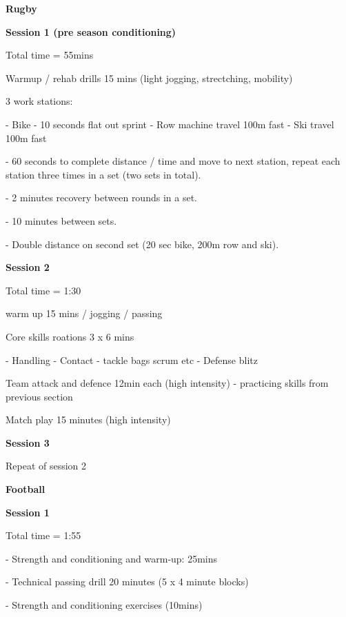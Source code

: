 \documentclass[
  english,
  man,floatsintext]{apa6}
\begin{document}
\begin{flushleft}

\begin{center}

  \textbf{Rugby}
  
\end{center}

  \textbf{Session 1 (pre season conditioning)}

Total time = 55mins

Warmup / rehab drills 15 mins (light jogging, strectching, mobility)

3 work stations:

- Bike - 10 seconds flat out sprint
- Row machine travel 100m fast
- Ski travel 100m fast

- 60 seconds to complete distance / time and move to next station, repeat each station three times in a set (two sets in total).

- 2 minutes recovery between rounds in a set.

- 10 minutes between sets.

- Double distance on second set (20 sec bike, 200m row and ski).


  \textbf{Session 2}

Total time = 1:30

warm up 15 mins / jogging / passing

Core skills roations 3 x 6 mins

  - Handling 
  - Contact - tackle bags scrum etc
  - Defense blitz
  
Team attack and defence 12min each (high intensity) - practicing skills from previous section

Match play 15 minutes (high intensity)


  \textbf{Session 3}

Repeat of session 2

\clearpage

\begin{center}

  \textbf{Football}
  
\end{center}

\textbf{Session 1}

Total time = 1:55

- Strength and conditioning and warm-up: 25mins

- Technical passing drill 20 minutes (5 x 4 minute blocks)

- Strength and conditioning exercises (10mins)


\end{flushleft}
\end{document}
